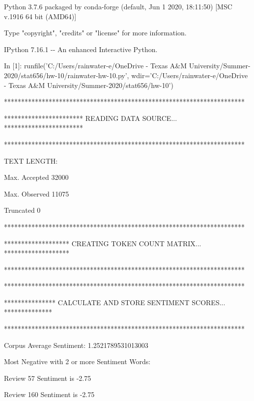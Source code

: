 
Python 3.7.6 \textbar{} packaged by conda-forge \textbar{} (default, Jun
1 2020, 18:11:50) {[}MSC v.1916 64 bit (AMD64){]}

Type "copyright", "credits" or "license" for more information.

\hfill\break

IPython 7.16.1 -\/- An enhanced Interactive Python.

\hfill\break

{In {[}}{1}{{]}:} runfile('C:/Users/rainwater-e/OneDrive - Texas A\&M
University/Summer-2020/stat656/hw-10/rainwater-hw-10.py',
wdir='C:/Users/rainwater-e/OneDrive - Texas A\&M
University/Summer-2020/stat656/hw-10')

\hfill\break

**********************************************************************

*********************** READING DATA SOURCE... ***********************

**********************************************************************

\hfill\break

TEXT LENGTH:

Max. Accepted 32000

Max. Observed 11075

Truncated 0

\hfill\break

**********************************************************************

******************* CREATING TOKEN COUNT MATRIX... *******************

**********************************************************************

\hfill\break

**********************************************************************

*************** CALCULATE AND STORE SENTIMENT SCORES... **************

**********************************************************************

\hfill\break

Corpus Average Sentiment: 1.2521789531013003

\hfill\break

Most Negative with 2 or more Sentiment Words:

Review 57 Sentiment is -2.75

Review 160 Sentiment is -2.75

